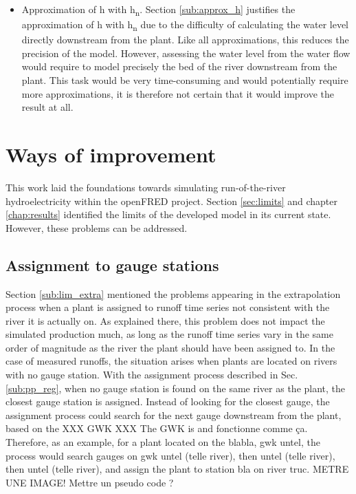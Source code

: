 \begin{itemize}
 \item Approximation of h with h\textsubscript{n}. Section \ref{sub:approx_h} justifies the approximation of h with h\textsubscript{n} due to the difficulty of calculating the water level directly downstream from the plant.  Like all approximations, this reduces the precision of the model. However, assessing the water level from the water flow would require to model precisely the bed of the river downstream from the plant. This task would be very time-consuming and would potentially require more approximations, it is therefore not certain that it would improve the result at all.
\end{itemize}


\section{Ways of improvement}
\label{sec:improv}

This work laid the foundations towards simulating run-of-the-river hydroelectricity within the openFRED project. Section \ref{sec:limits} and chapter \ref{chap:results} identified the limits of the developed model in its current state. However, these problems can be addressed.

\subsection{Assignment to gauge stations}
\label{sub:imp_assign_gauge}
Section \ref{sub:lim_extra} mentioned the problems appearing in the extrapolation process when a plant is assigned to runoff time series not consistent with the river it is actually on. As explained there, this problem does not impact the simulated production much, as long as the runoff time series vary in the same order of magnitude as the river the plant should have been assigned to. In the case of measured runoffs, the situation arises when plants are located on rivers with no gauge station. With the assignment process described in Sec. \ref{sub:pp_reg}, when no gauge station is found on the same river as the plant, the closest gauge station is assigned. \newline
Instead of looking for the closest gauge, the assignment process could search for the next gauge downstream from the plant, based on the XXX GWK XXX
The GWK is and fonctionne comme ça. Therefore, as an example, for a plant located on the blabla, gwk untel, the process would search gauges on gwk untel (telle river), then untel (telle river), then untel (telle river), and assign the plant to station bla on river truc.
METRE UNE IMAGE!
Mettre un pseudo code ?

